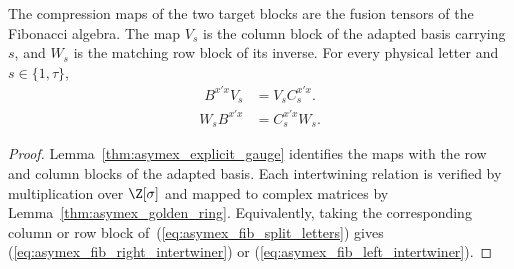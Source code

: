 \begin{lemma}
    \label{thm:asymex_fib_fusion_tensors}
    \leanok
    The compression maps of the two target blocks are the fusion tensors
    of the Fibonacci algebra. The map $V_s$ is the column block of the
    adapted basis carrying $s$, and $W_s$ is the matching row block of
    its inverse. For every physical letter and $s\in\{1,\tau\}$,
    \begin{align}
        B^{x'x}V_s & =V_sC_s^{x'x}.
        \label{eq:asymex_fib_right_intertwiner}
    \end{align}
    \begin{align}
        W_sB^{x'x} & =C_s^{x'x}W_s.
        \label{eq:asymex_fib_left_intertwiner}
    \end{align}
\end{lemma}

\begin{proof}
    \leanok
    Lemma~\ref{thm:asymex_explicit_gauge} identifies the maps with
    the row and column blocks of the adapted basis.
    Each intertwining relation is verified by multiplication over
    $\Z[\sigma]$ and mapped to complex matrices by
    Lemma~\ref{thm:asymex_golden_ring}.
    Equivalently, taking the corresponding column or row block
    of~(\ref{eq:asymex_fib_split_letters}) gives
    (\ref{eq:asymex_fib_right_intertwiner}) or
    (\ref{eq:asymex_fib_left_intertwiner}).
\end{proof}

